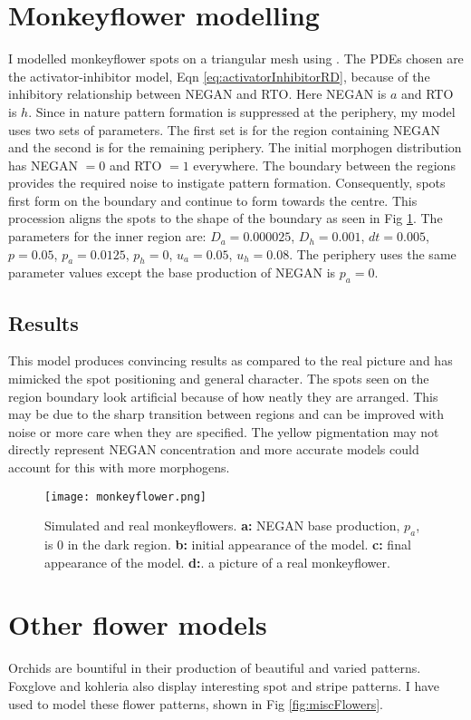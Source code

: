 \section{Monkeyflower modelling}
I modelled monkeyflower spots on a triangular mesh using \ProgramName{}. The PDEs chosen are the activator-inhibitor model, Eqn \eqref{eq:activatorInhibitorRD}, because of the inhibitory relationship between NEGAN and RTO. Here NEGAN is $a$ and RTO is $h$. Since in nature pattern formation is suppressed at the periphery, my model uses two sets of parameters. The first set is for the region containing NEGAN and the second is for the remaining periphery. The initial morphogen distribution has NEGAN $= 0$ and RTO $= 1$ everywhere. The boundary between the regions provides the required noise to instigate pattern formation. Consequently, spots first form on the boundary and continue to form towards the centre. This procession aligns the spots to the shape of the boundary as seen in Fig \ref{fig:monkeyflower}. The parameters for the inner region are: $D_a=0.000025$, $D_h=0.001$, $dt=0.005$, $p=0.05$, $p_a=0.0125$, $p_h=0$, $u_a=0.05$, $u_h=0.08$. The periphery uses the same parameter values except the base production of NEGAN is $p_a=0$.

\subsection*{Results}
This model produces convincing results as compared to the real picture and has mimicked the spot positioning and general character. The spots seen on the region boundary look artificial because of how neatly they are arranged. This may be due to the sharp transition between regions and can be improved with noise or more care when they are specified. The yellow pigmentation may not directly represent NEGAN concentration and more accurate models could account for this with more morphogens.

\begin{figure}[ht]
	\centering
	\texttt{[image: monkeyflower.png]}
	\caption{Simulated and real monkeyflowers. \textbf{a:} NEGAN base production, $p_a$, is 0 in the dark region. \textbf{b:} initial appearance of the model. \textbf{c:} final appearance of the model. \textbf{d:}. a picture of a real monkeyflower.}
	\label{fig:monkeyflower}
\end{figure}

\section{Other flower models}
Orchids are bountiful in their production of beautiful and varied patterns. Foxglove and kohleria also display interesting spot and stripe patterns. I have used \ProgramName{} to model these flower patterns, shown in Fig \ref{fig:miscFlowers}.

